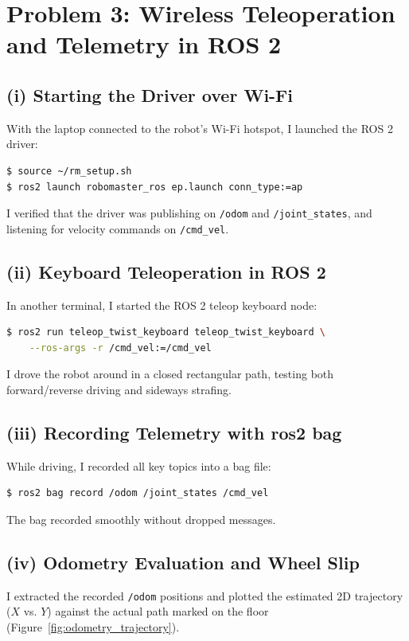 \documentclass[11pt,a4paper]{article}
\begin{document}
\section*{Problem 3: Wireless Teleoperation and Telemetry in ROS 2}

\subsection*{(i) Starting the Driver over Wi-Fi}
With the laptop connected to the robot's Wi-Fi hotspot, I launched the ROS 2 driver:
\begin{lstlisting}[language=bash]
$ source ~/rm_setup.sh
$ ros2 launch robomaster_ros ep.launch conn_type:=ap
\end{lstlisting}
I verified that the driver was publishing on \texttt{/odom} and \texttt{/joint\_states}, and listening for velocity commands on \texttt{/cmd\_vel}.

\subsection*{(ii) Keyboard Teleoperation in ROS 2}
In another terminal, I started the ROS 2 teleop keyboard node:
\begin{lstlisting}[language=bash]
$ ros2 run teleop_twist_keyboard teleop_twist_keyboard \
    --ros-args -r /cmd_vel:=/cmd_vel
\end{lstlisting}
I drove the robot around in a closed rectangular path, testing both forward/reverse driving and sideways strafing.

\subsection*{(iii) Recording Telemetry with ros2 bag}
While driving, I recorded all key topics into a bag file:
\begin{lstlisting}[language=bash]
$ ros2 bag record /odom /joint_states /cmd_vel
\end{lstlisting}
The bag recorded smoothly without dropped messages.

\subsection*{(iv) Odometry Evaluation and Wheel Slip}
I extracted the recorded \texttt{/odom} positions and plotted the estimated 2D trajectory ($X$ vs. $Y$) against the actual path marked on the floor (Figure~\ref{fig:odometry_trajectory}).
\end{document}
